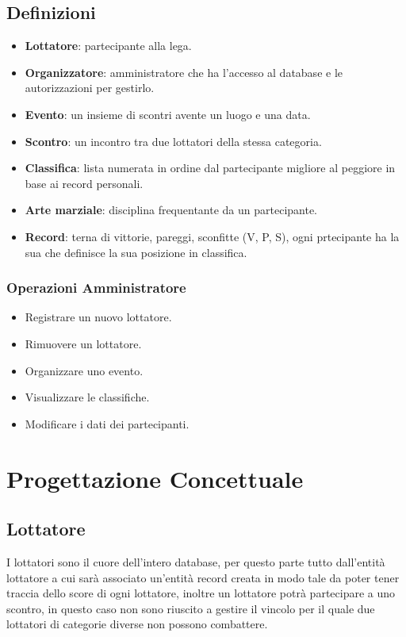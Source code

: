 \documentclass[a4paper,12pt]{report}
\begin{document}
\section{Definizioni}
\begin{itemize}
    \item \textbf{Lottatore}: partecipante alla lega.
    \item \textbf{Organizzatore}: amministratore che ha l'accesso al database e le autorizzazioni per gestirlo. 
    \item \textbf{Evento}: un insieme di scontri avente un luogo e una data.
    \item \textbf{Scontro}: un incontro tra due lottatori della stessa categoria.
    \item \textbf{Classifica}: lista numerata in ordine dal partecipante migliore al peggiore in base ai record personali.
    \item \textbf{Arte marziale}: disciplina frequentante da un partecipante.
    \item \textbf{Record}: terna di vittorie, pareggi, sconfitte (V, P, S), ogni prtecipante ha la sua che definisce la sua posizione in 
    classifica.
\end{itemize}

\subsection{Operazioni Amministratore}
\begin{itemize}
    \item Registrare un nuovo lottatore.
    \item Rimuovere un lottatore.
    \item Organizzare uno evento.
    \item Visualizzare le classifiche.
    \item Modificare i dati dei partecipanti.
\end{itemize}

\chapter{Progettazione Concettuale}
\section{Lottatore}
I lottatori sono il cuore dell'intero database, per questo parte tutto dall'entità lottatore a cui sarà associato un'entità 
record creata in modo tale da poter tener traccia dello score di ogni lottatore, inoltre un lottatore potrà partecipare a 
uno scontro, in questo caso non sono riuscito a gestire il vincolo per il quale due lottatori di categorie diverse non possono 
combattere.
\end{document}
